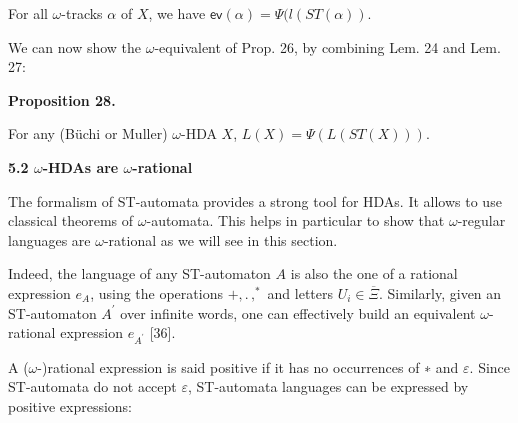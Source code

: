 For all $\omega$-tracks $\alpha$ of $X$, we have $\mathsf{ev}(\alpha)=\Psi(l(ST(\alpha))$.\par
 
 
 
 
We can now show the $\omega$-equivalent of Prop. 26, by combining Lem. 24 and Lem. 27:\par
 
 
 
\par\medskip\noindent\textbf{Proposition 28.}\par
 
 
For any (Büchi or Muller) $\omega$-HDA $X$, $L(X)=\Psi(L(ST(X)))$.\par
 
 
 
 
 
\par\medskip\noindent\textbf{5.2 $\omega$-HDAs are $\omega$-rational}\par
 
 
The formalism of ST-automata provides a strong tool for HDAs. It allows to use classical theorems of $\omega$-automata. This helps in particular to show that $\omega$-regular languages are $\omega$-rational as we will see in this section.\par
 
 
 
Indeed, the language of any ST-automaton $A$ is also the one of a rational expression $e_{A}$, using the operations $+,.\,,^{*}$ and letters $U_{i}\in\overline{\Xi}$. Similarly, given an ST-automaton $A^{\prime}$ over infinite words, one can effectively build an equivalent $\omega$-rational expression $e_{A^{\prime}}$ [36].\par
 
 
 
A ($\omega$-)rational expression is said positive if it has no occurrences of ∗ and $\varepsilon$. Since ST-automata do not accept $\varepsilon$, ST-automata languages can be expressed by positive expressions:\par
 
